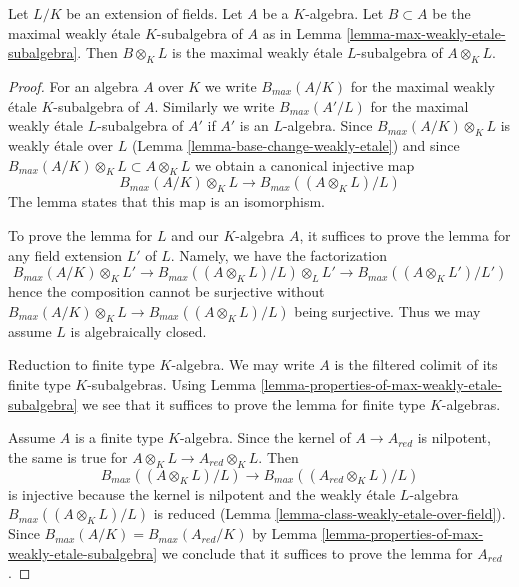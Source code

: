 \begin{lemma}
\label{lemma-change-fields-max-weakly-etale-subalgebra}
Let $L/K$ be an extension of fields. Let $A$ be a $K$-algebra.
Let $B \subset A$ be the maximal weakly \'etale $K$-subalgebra of
$A$ as in Lemma \ref{lemma-max-weakly-etale-subalgebra}.
Then $B \otimes_K L$ is the maximal weakly \'etale $L$-subalgebra
of $A \otimes_K L$.
\end{lemma}

\begin{proof}
For an algebra $A$ over $K$ we write $B_{max}(A/K)$
for the maximal weakly \'etale $K$-subalgebra of $A$.
Similarly we write $B_{max}(A'/L)$ for the maximal weakly \'etale
$L$-subalgebra of $A'$ if $A'$ is an $L$-algebra.
Since $B_{max}(A/K) \otimes_K L$ is weakly \'etale over $L$
(Lemma \ref{lemma-base-change-weakly-etale})
and since $B_{max}(A/K) \otimes_K L \subset A \otimes_K L$
we obtain a canonical injective map
$$
B_{max}(A/K) \otimes_K L \to B_{max}((A \otimes_K L)/L)
$$
The lemma states that this map is an isomorphism.

\medskip\noindent
To prove the lemma for $L$ and our $K$-algebra $A$, it suffices to
prove the lemma for any field extension $L'$ of $L$. Namely, we have
the factorization
$$
B_{max}(A/K) \otimes_K L' \to
B_{max}((A \otimes_K L)/L) \otimes_L L' \to
B_{max}((A \otimes_K L')/L')
$$
hence the composition cannot be surjective without
$B_{max}(A/K) \otimes_K L \to B_{max}((A \otimes_K L)/L)$
being surjective. Thus we may assume $L$ is algebraically closed.

\medskip\noindent
Reduction to finite type $K$-algebra. We may write $A$
is the filtered colimit of its finite type $K$-subalgebras.
Using Lemma \ref{lemma-properties-of-max-weakly-etale-subalgebra}
we see that it suffices to prove the lemma for finite type
$K$-algebras.

\medskip\noindent
Assume $A$ is a finite type $K$-algebra. Since the kernel
of $A \to A_{red}$ is nilpotent, the same is true for
$A \otimes_K L \to A_{red} \otimes_K L$. Then
$$
B_{max}((A \otimes_K L)/L) \to B_{max}((A_{red} \otimes_K L)/L)
$$
is injective because the kernel is nilpotent and the
weakly \'etale $L$-algebra $B_{max}((A \otimes_K L)/L)$ is reduced
(Lemma \ref{lemma-class-weakly-etale-over-field}).
Since $B_{max}(A/K) = B_{max}(A_{red}/K)$
by Lemma \ref{lemma-properties-of-max-weakly-etale-subalgebra}
we conclude
that it suffices to prove the lemma for $A_{red}$.


\end{proof}

